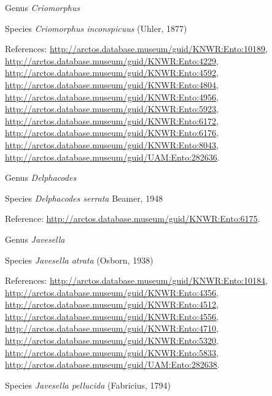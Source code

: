 \documentclass[9pt, article]{memoir}
\begin{document}
\begin{multicols}{2}
\vspace{6pt}\noindent\hspace{30pt}Genus \textit{Criomorphus}


\vspace{6pt}\noindent\hspace{36pt}Species \textit{Criomorphus inconspicuus} (Uhler, 1877)


References: 
\url{http://arctos.database.museum/guid/KNWR:Ento:10189}, 
\url{http://arctos.database.museum/guid/KNWR:Ento:4229}, 
\url{http://arctos.database.museum/guid/KNWR:Ento:4592}, 
\url{http://arctos.database.museum/guid/KNWR:Ento:4804}, 
\url{http://arctos.database.museum/guid/KNWR:Ento:4956}, 
\url{http://arctos.database.museum/guid/KNWR:Ento:5923}, 
\url{http://arctos.database.museum/guid/KNWR:Ento:6172}, 
\url{http://arctos.database.museum/guid/KNWR:Ento:6176}, 
\url{http://arctos.database.museum/guid/KNWR:Ento:8043}, 
\url{http://arctos.database.museum/guid/UAM:Ento:282636}.

\vspace{6pt}\noindent\hspace{30pt}Genus \textit{Delphacodes}


\vspace{6pt}\noindent\hspace{36pt}Species \textit{Delphacodes serrata} Beamer, 1948


Reference: 
\url{http://arctos.database.museum/guid/KNWR:Ento:6175}.

\vspace{6pt}\noindent\hspace{30pt}Genus \textit{Javesella}


\vspace{6pt}\noindent\hspace{36pt}Species \textit{Javesella atrata} (Osborn, 1938)


References: 
\url{http://arctos.database.museum/guid/KNWR:Ento:10184}, 
\url{http://arctos.database.museum/guid/KNWR:Ento:4356}, 
\url{http://arctos.database.museum/guid/KNWR:Ento:4512}, 
\url{http://arctos.database.museum/guid/KNWR:Ento:4556}, 
\url{http://arctos.database.museum/guid/KNWR:Ento:4710}, 
\url{http://arctos.database.museum/guid/KNWR:Ento:5320}, 
\url{http://arctos.database.museum/guid/KNWR:Ento:5833}, 
\url{http://arctos.database.museum/guid/UAM:Ento:282638}.

\vspace{6pt}\noindent\hspace{36pt}Species \textit{Javesella pellucida} (Fabricius, 1794)



\end{multicols}
\end{document}
